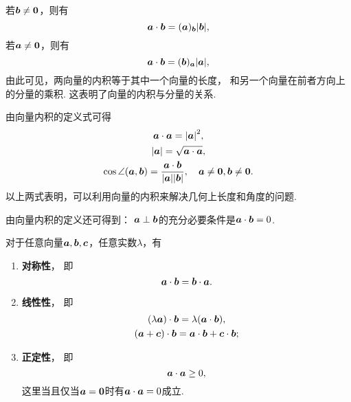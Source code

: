 若\(\boldsymbol{b}\neq\boldsymbol{0}\)，则有
\begin{equation}
	\boldsymbol{a}\cdot\boldsymbol{b}
	= (\boldsymbol{a})_{\boldsymbol{b}} \abs{\boldsymbol{b}},
\end{equation}
若\(\boldsymbol{a}\neq\boldsymbol{0}\)，则有
\begin{equation}
	\boldsymbol{a}\cdot\boldsymbol{b}
	= (\boldsymbol{b})_{\boldsymbol{a}} \abs{\boldsymbol{a}},
\end{equation}
由此可见，两向量的内积等于其中一个向量的长度，
和另一个向量在前者方向上的分量的乘积.
这表明了向量的内积与分量的关系.

由向量内积的定义式可得
\begin{gather}
	\boldsymbol{a}\cdot\boldsymbol{a}=\abs{\boldsymbol{a}}^2, \\
	\abs{\boldsymbol{a}} = \sqrt{\boldsymbol{a}\cdot\boldsymbol{a}}, \\
	\cos\angle(\boldsymbol{a},\boldsymbol{b}) = \frac{\boldsymbol{a}\cdot\boldsymbol{b}}{\abs{\boldsymbol{a}} \abs{\boldsymbol{b}}},
	\quad \boldsymbol{a}\neq\boldsymbol{0},\boldsymbol{b}\neq\boldsymbol{0}.
\end{gather}
以上两式表明，可以利用向量的内积来解决几何上长度和角度的问题.

由向量内积的定义还可得到：
\(\boldsymbol{a}\perp\boldsymbol{b}\)的充分必要条件是\(\boldsymbol{a}\cdot\boldsymbol{b}=0\).

\begin{theorem}
对于任意向量\(\boldsymbol{a},\boldsymbol{b},\boldsymbol{c}\)，任意实数\(\lambda\)，有\begin{enumerate}
	\item {\rm\bf 对称性}，
	即\begin{equation}\label{equation:解析几何.内积的对称性}
		\boldsymbol{a}\cdot\boldsymbol{b} = \boldsymbol{b}\cdot\boldsymbol{a}.
	\end{equation}

	\item {\rm\bf 线性性}，
	即\begin{gather}
		(\lambda\boldsymbol{a})\cdot\boldsymbol{b}
		= \lambda(\boldsymbol{a}\cdot\boldsymbol{b}),
			\label{equation:解析几何.内积的线性性1} \\
		(\boldsymbol{a}+\boldsymbol{c})\cdot\boldsymbol{b}
		= \boldsymbol{a}\cdot\boldsymbol{b}+\boldsymbol{c}\cdot\boldsymbol{b};
			\label{equation:解析几何.内积的线性性2} \\
	\end{gather}

	\item {\rm\bf 正定性}，
	即\begin{equation}\label{equation:解析几何.内积的正定性}
		\boldsymbol{a}\cdot\boldsymbol{a}\geq0,
	\end{equation}
	这里当且仅当\(\boldsymbol{a}=\boldsymbol{0}\)时有\(\boldsymbol{a}\cdot\boldsymbol{a}=0\)成立.
\end{enumerate}
\end{theorem}

